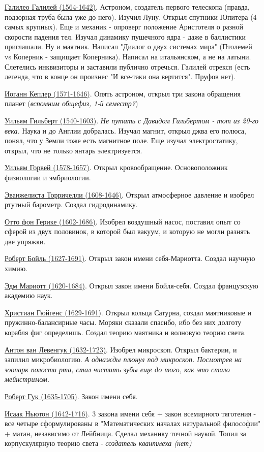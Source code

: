 \underline{Галилео Галилей (1564-1642)}. Астроном, создатель первого телескопа (правда, подзорная труба была уже до него). Изучил Луну. Открыл спутники Юпитера (4 самых крупных). Еще и механик - опроверг положение Аристотеля о разной скорости падения тел. Изучал динамику пушечного ядра - даже в баллистики приглашали. Ну и маятник. Написал "Диалог о двух системах мира" (Птолемей vs Коперник - защищает Коперника). Написал на итальянском, а не на латыни. Слетелись инквизиторы и заставили публично отречься. Галилей отрекся (есть легенда, что в конце он произнес "И все-таки она вертится". Пруфов нет).  

\underline{Иоганн Кеплер (1571-1646)}. Опять астроном, открыл три закона обращения планет (\textit{вспомним общефиз, 1-й семестр?})

\underline{Уильям Гильберт (1540-1603)}. \textit{Не путать с Давидом Гильбертом - тот из 20-го века.} Наука и до Англии добралась. Изучал магнит, открыл джва его полюса, понял, что у Земли тоже есть магнитное поле. Еще изучал электростатику, открыл, что не только янтарь электризуется.

\underline{Уильям Горвей (1578-1657)}. Открыл кровообращение. Основоположник физиологии и эмбриологии.

\underline{Эванжелиста Торричелли (1608-1646)}. Открыл атмосферное давление и изобрел ртутный барометр. Создал гидродинамику.

\underline{Отто фон Герике (1602-1686)}. Изобрел воздушный насос, поставил опыт со сферой из двух половинок, в которой был вакуум, и которую не могли разнять две упряжки. 

\underline{Роберт Бойль (1627-1691)}. Открыл закон имени себя-Мариотта. Создал научную химию.

\underline{Эдм Мариотт (1620-1684)}. Открыл закон имени Бойля-себя. Создал французскую академию наук.

\underline{Христиан Гюйгенс (1629-1691)}. Открыл кольца Сатурна, создал маятниковые и пружинно-балансирные часы. Моряки сказали спасибо, ибо без них долготу корабля фиг определишь. Создал теорию маятника и волновую теорию света.

\underline{Антон ван Левенгук (1632-1723)}. Изобрел микроскоп. Открыл бактерии, и запилил микробиологию. \textit{А однажды плюнул под микроскоп. Посмотрев на зоопарк полости рта, стал чистить зубы еще до того, как это стало мейнстримом.}

\underline{Роберт Гук (1635-1705)}. Закон имени себя.

\underline{Исаак Ньютон (1642-1716)}. 3 закона имени себя + закон всемирного тяготения - все четыре сформулированы в "Математических началах натуральной философии" + матан, независимо от Лейбница. Сделал механику точной наукой. Топил за корпускулярную теорию света - \textit{создатель квантмеха (нет)}
 
